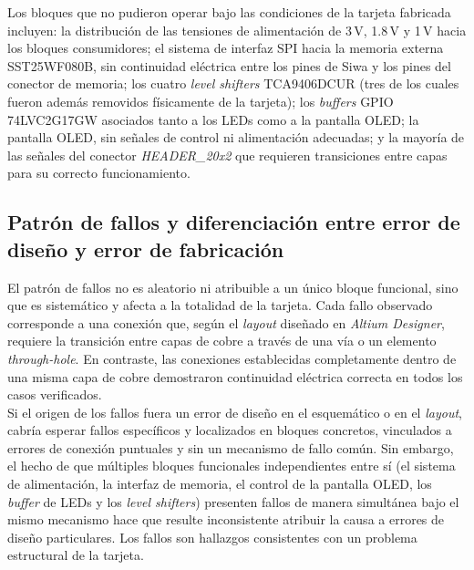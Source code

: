 \documentclass[journal,trans]{IEEEtran}
\begin{document}
Los bloques que no pudieron operar bajo las condiciones de la tarjeta
fabricada incluyen: la distribución de las tensiones de alimentación de 3\,V, 1.8\,V y
1\,V hacia los bloques consumidores; el sistema de interfaz SPI hacia la memoria externa
SST25WF080B, sin continuidad eléctrica entre los pines de Siwa y los pines del conector
de memoria; los cuatro \textit{level shifters} TCA9406DCUR (tres de los cuales fueron
además removidos físicamente de la tarjeta); los \textit{buffers} GPIO 74LVC2G17GW asociados tanto
a los LEDs como a la pantalla OLED; la pantalla OLED, sin señales de control ni
alimentación adecuadas; y la mayoría de las señales del conector \textit{HEADER\_20x2}
que requieren transiciones entre capas para su correcto funcionamiento.

\subsection{Patrón de fallos y diferenciación entre error de diseño y error de
fabricación}

El patrón de fallos no es aleatorio ni atribuible a un único bloque funcional, sino que es sistemático y afecta a la
totalidad de la tarjeta. Cada fallo observado corresponde a una conexión que, según el
\textit{layout} diseñado en \textit{Altium Designer}, requiere la transición entre capas de cobre
a través de una vía o un elemento \textit{through-hole}. En contraste, las conexiones
establecidas completamente dentro de una misma capa de cobre demostraron continuidad
eléctrica correcta en todos los casos verificados.\\

Si el origen de los fallos
fuera un error de diseño en el esquemático o en el \textit{layout}, cabría esperar fallos
específicos y localizados en bloques concretos, vinculados a errores de conexión puntuales
y sin un mecanismo de fallo común. Sin embargo, el hecho de que múltiples bloques
funcionales independientes entre sí (el sistema de alimentación, la interfaz de memoria,
el control de la pantalla OLED, los \textit{buffer} de LEDs y los \textit{level shifters}) presenten
fallos de manera simultánea bajo el mismo mecanismo hace que resulte inconsistente
atribuir la causa a errores de diseño particulares. Los fallos son hallazgos consistentes
con un problema estructural de la tarjeta.\\
\end{document}
